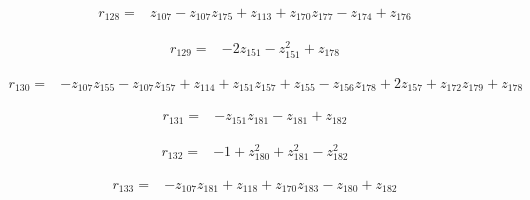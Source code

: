 \par\noindent\begin{minipage}{\linewidth}
\begin{align*}
r_{128}={}&z_{107}-z_{107}z_{175}+z_{113}+z_{170}z_{177}-z_{174}+z_{176}
\end{align*}
\end{minipage}\par
\par\noindent\begin{minipage}{\linewidth}
\begin{align*}
r_{129}={}&-2z_{151}-z_{151}^{2}+z_{178}
\end{align*}
\end{minipage}\par
\par\noindent\begin{minipage}{\linewidth}
\begin{align*}
r_{130}={}&-z_{107}z_{155}-z_{107}z_{157}+z_{114}+z_{151}z_{157}+z_{155}-z_{156}z_{178}+2z_{157}+z_{172}z_{179}+z_{178}
\end{align*}
\end{minipage}\par
\par\noindent\begin{minipage}{\linewidth}
\begin{align*}
r_{131}={}&-z_{151}z_{181}-z_{181}+z_{182}
\end{align*}
\end{minipage}\par
\par\noindent\begin{minipage}{\linewidth}
\begin{align*}
r_{132}={}&-1+z_{180}^{2}+z_{181}^{2}-z_{182}^{2}
\end{align*}
\end{minipage}\par
\par\noindent\begin{minipage}{\linewidth}
\begin{align*}
r_{133}={}&-z_{107}z_{181}+z_{118}+z_{170}z_{183}-z_{180}+z_{182}
\end{align*}
\end{minipage}\par
